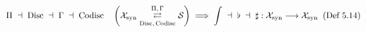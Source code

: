 \documentclass[preview]{standalone}
\begin{document}
\begin{align*}
\special{dvisvgm:raw <g id='unique000'>}\Pi \;\dashv\; \operatorname{Disc} \;\dashv\; \Gamma \;\dashv\; \operatorname{Codisc} \quad\left(\mathcal{X}_{\text{syn}} \underset{\operatorname{Disc},\,\operatorname{Codisc}}{\overset{\Pi,\,\Gamma}{\rightleftarrows}} \mathcal{S}\right) \;\Longrightarrow\; \int \;\dashv\; \flat \;\dashv\; \sharp : \mathcal{X}_{\text{syn}} \longrightarrow \mathcal{X}_{\text{syn}}\;\;(\text{Def 5.14})\special{dvisvgm:raw </g>}
\end{align*}
\end{document}
